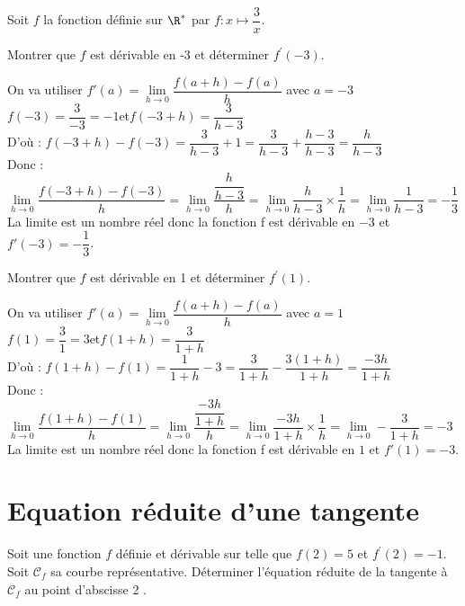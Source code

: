 \documentclass[11pt,a4paper]{article}  %
\begin{document}
Soit $f$ la fonction définie sur $\R^*$ par $f: x \mapsto \dfrac{3}{x}$.
\begin{enumMet}
	\item Montrer que $f$  est dérivable en -3 et déterminer $f^{\prime}(-3)$.
	\begin{corrBox}
		On va utiliser $f'(a)=\lim \limits_{h \rightarrow 0} \dfrac{f(a+h)-f(a)}{h}$ avec $a=-3$\\
		$f(-3)=\dfrac{3}{-3}=-1$\quad\quad et\quad\quad  $f(-3+h)=\dfrac{3}{h-3}$\\
		D'où : $f(-3+h)-f(-3)=\dfrac{3}{h-3}+1=\dfrac{3}{h-3}+\dfrac{h-3}{h-3}=\dfrac{h}{h-3}$\\
		Donc : $\lim \limits_{h \rightarrow 0} \dfrac{f(-3+h)-f(-3)}{h}=\lim \limits_{h \rightarrow 0} \dfrac{\dfrac{h}{h-3}}{h}=\lim \limits_{h \rightarrow 0} \dfrac{h}{h-3}\times \dfrac{1}{h}=\lim \limits_{h \rightarrow 0} \dfrac{1}{h-3}=-\dfrac{1}{3}$\\
		La limite est un nombre réel donc la fonction f est dérivable en $-3$ et $f'(-3)=-\dfrac{1}{3}$.
	\end{corrBox}
	\item Montrer que $f$ est dérivable en 1 et déterminer $f^{\prime}(1)$.
	\begin{corrBox}
		On va utiliser $f'(a)=\lim \limits_{h \rightarrow 0} \dfrac{f(a+h)-f(a)}{h}$ avec $a=1$\\
		$f(1)=\dfrac{3}{1}=3$\quad\quad et\quad\quad  $f(1+h)=\dfrac{3}{1+h}$\\
		D'où : $f(1+h)-f(1)=\dfrac{1}{1+h}-3=\dfrac{3}{1+h}-\dfrac{3(1+h)}{1+h}=\dfrac{-3h}{1+h}$\\
		Donc : $\lim \limits_{h \rightarrow 0} \dfrac{f(1+h)-f(1)}{h}=\lim \limits_{h \rightarrow 0} \dfrac{\dfrac{-3h}{1+h}}{h}=\lim \limits_{h \rightarrow 0} \dfrac{-3h}{1+h}\times \dfrac{1}{h}=\lim \limits_{h \rightarrow 0} -\dfrac{3}{1+h}=-3$\\
		La limite est un nombre réel donc la fonction f est dérivable en $1$ et $f'(1)=-3$.
	\end{corrBox}
\end{enumMet}

\section*{Equation réduite d'une tangente}

\exercice{}

Soit une fonction $f$ définie et dérivable sur \R telle que $f(2)=5$ et $f^{\prime}(2)=-1$.
Soit $\mathscr{C}_f$ sa courbe représentative. Déterminer l'équation réduite de la tangente à $\mathscr{C}_f$ au point d'abscisse 2 .
\end{document}

